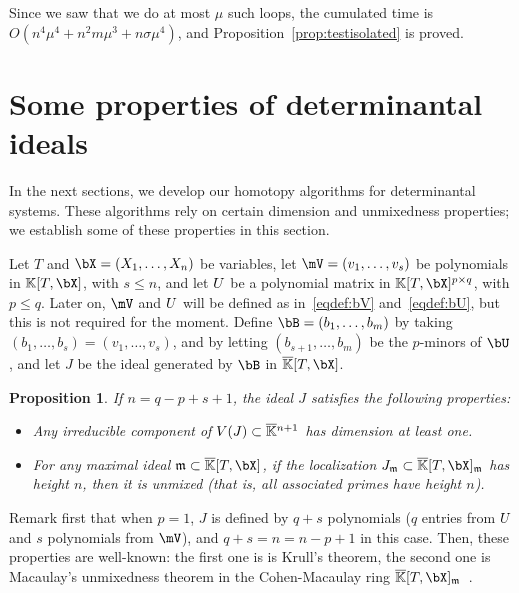 \documentclass[12pt]{article}
\newtheorem{proposition}[definition]{Proposition}
\begin{document}
Since we saw that we do at most $\mu$ such loops, the cumulated time
is $O(n^4 \mu^4 + n^2 m \mu^3 + n \sigma \mu^4)$, and
Proposition~\ref{prop:testisolated} is proved.


\section{Some properties of determinantal ideals}\label{sec:check}

In the next sections, we develop our homotopy algorithms for
determinantal systems. These algorithms rely on certain dimension and
unmixedness properties; we establish some of these properties in this
section.

Let $T$ and $\bX=(X_1,\dots,X_n)$ be variables, let
$\mV=(v_1,\dots,v_s)$ be polynomials in $\KK[T,\bX]$, with $s \le n$,
and let ${U}$ be a polynomial matrix in $\KK[T,\bX]^{p \times q}$,
with $p \le q$.  Later on, $\mV$ and ${U}$ will be defined 
as in~\eqref{eqdef:bV} and~\eqref{eqdef:bU}, but this is 
not required for the moment.
Define $\bB=(b_1,\dots,b_m)$ by taking $(b_1,\dots,b_s) =
(v_1,\dots,v_s)$, and by letting $(b_{s+1},\dots,b_m)$ be the
$p$-minors of $\bU$, and let $J$ be the ideal generated by $\bB$ in
$\KKbar[T,\bX]$.

\begin{proposition}\label{prop:KH1H2}
  If $n=q-p+s+1$, the ideal $J$ satisfies the following properties:
\begin{itemize}[leftmargin=8mm]
\item Any irreducible component of $V(J) \subset
  \overline{\mathbb{K}}{}^{n+1}$ has dimension at least one.
\item For any maximal ideal $\m \subset\KKbar[T,\bX]$,
  if the localization $J_\m \subset \KKbar[T,\bX]_\m$ has height $n$,
  then it is unmixed (that is, all associated primes have height $n$).
\end{itemize}
\end{proposition}
Remark first that when $p=1$, $J$ is defined by $q+s$ polynomials ($q$
entries from ${U}$ and $s$ polynomials from $\mV$), and $q+s=n=n-p+1$ in
this case. Then, these properties are well-known: the first one is is
Krull's theorem, the second one is Macaulay's unmixedness theorem in
the Cohen-Macaulay ring
$\KKbar[T,\bX]_\m$~\cite[Corollary~18.14]{Eisenbud95}.
\end{document}

